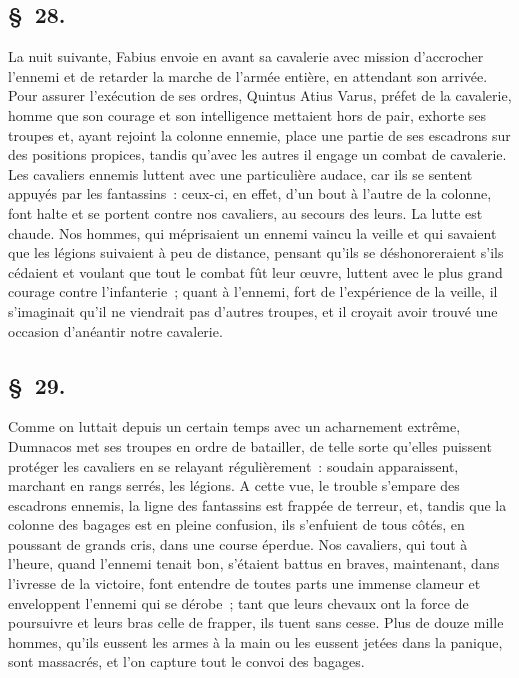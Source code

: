 \documentclass[french,twoside]{book} %
\begin{document}
\subsection[{§ 28.}]{ \textsc{§ 28.} }
\noindent La nuit suivante, Fabius envoie en avant sa cavalerie avec mission d’accrocher l’ennemi et de retarder la marche de l’armée entière, en attendant son arrivée. Pour assurer l’exécution de ses ordres, Quintus Atius Varus, préfet de la cavalerie, homme que son courage et son intelligence mettaient hors de pair, exhorte ses troupes et, ayant rejoint la colonne ennemie, place une partie de ses escadrons sur des positions propices, tandis qu’avec les autres il engage un combat de cavalerie. Les cavaliers ennemis luttent avec une particulière audace, car ils se sentent appuyés par les fantassins : ceux-ci, en effet, d’un bout à l’autre de la colonne, font halte et se portent contre nos cavaliers, au secours des leurs. La lutte est chaude. Nos hommes, qui méprisaient un ennemi vaincu la veille et qui savaient que les légions suivaient à peu de distance, pensant qu’ils se déshonoreraient s’ils cédaient et voulant que tout le combat fût leur œuvre, luttent avec le plus grand courage contre l’infanterie ; quant à l’ennemi, fort de l’expérience de la veille, il s’imaginait qu’il ne viendrait pas d’autres troupes, et il croyait avoir trouvé une occasion d’anéantir notre cavalerie.
\subsection[{§ 29.}]{ \textsc{§ 29.} }
\noindent Comme on luttait depuis un certain temps avec un acharnement extrême, Dumnacos met ses troupes en ordre de batailler, de telle sorte qu’elles puissent protéger les cavaliers en se relayant régulièrement : soudain apparaissent, marchant en rangs serrés, les légions. A cette vue, le trouble s’empare des escadrons ennemis, la ligne des fantassins est frappée de terreur, et, tandis que la colonne des bagages est en pleine confusion, ils s’enfuient de tous côtés, en poussant de grands cris, dans une course éperdue. Nos cavaliers, qui tout à l’heure, quand l’ennemi tenait bon, s’étaient battus en braves, maintenant, dans l’ivresse de la victoire, font entendre de toutes parts une immense clameur et enveloppent l’ennemi qui se dérobe ; tant que leurs chevaux ont la force de poursuivre et leurs bras celle de frapper, ils tuent sans cesse. Plus de douze mille hommes, qu’ils eussent les armes à la main ou les eussent jetées dans la panique, sont massacrés, et l’on capture tout le convoi des bagages.
\end{document}
